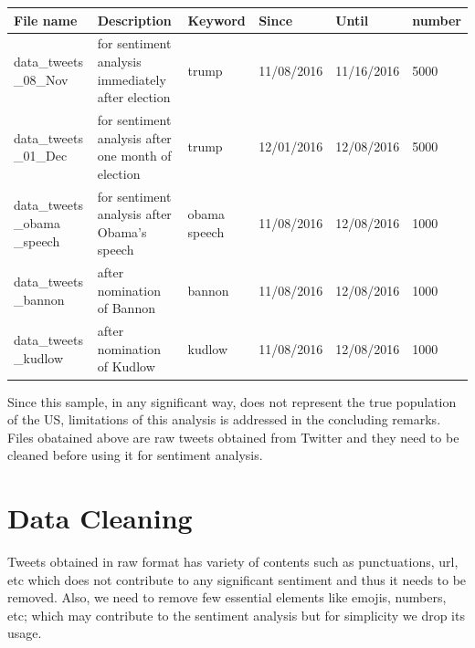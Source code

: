 \documentclass[a4paper,12pt]{book}
\theoremstyle{break}
\begin{document}
\begin{center}
\begin{tabular}{ |C{1.9cm}|C{1.9cm}|C{1.9cm}|C{1.9cm}|C{1.9cm}|C{1.9cm}| } 
 \hline
 File name & Description & Keyword & Since & Until & number \\ 
 \hline
 data\_tweets \_08\_Nov & for sentiment analysis immediately after election & trump & 11/08/2016 & 11/16/2016 & 5000 \\
 \hline
 data\_tweets \_01\_Dec & for sentiment analysis after one month of election & trump & 12/01/2016 & 12/08/2016 & 5000 \\
  \hline
 data\_tweets \_obama \_speech & for sentiment analysis after Obama's speech & obama speech & 11/08/2016 & 12/08/2016 & 1000 \\
  \hline
 data\_tweets \_bannon & after nomination of Bannon & bannon & 11/08/2016 & 12/08/2016 & 1000 \\
  \hline
 data\_tweets \_kudlow & after nomination of Kudlow & kudlow & 11/08/2016 & 12/08/2016 & 1000 \\
 \hline
\end{tabular}
\end{center}


Since this sample, in any significant way, does not represent the true population of the US, limitations of this analysis is addressed in the concluding remarks. Files obatained above are raw tweets obtained from Twitter and they need to be cleaned before using it for sentiment analysis.


\section{Data Cleaning}

Tweets obtained in raw format has variety of contents such as punctuations, url, etc which does not contribute to any significant sentiment and thus it needs to be removed. Also, we need to remove few essential elements like emojis, numbers, etc; which may contribute to the sentiment analysis but for simplicity we drop its usage.
\end{document}

